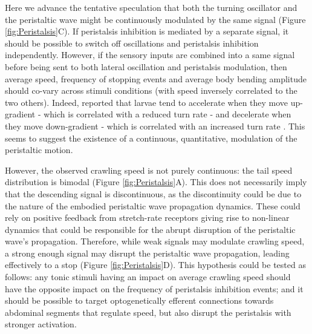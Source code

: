 \documentclass[11pt,a4paper]{article}
\begin{document}
Here we advance the tentative speculation that both the turning oscillator and the peristaltic wave might be continuously modulated by the same signal (Figure \ref{fig:Peristalsis}C).  If peristalsis inhibition is mediated by a separate signal, it should be possible to switch off oscillations and peristalsis inhibition independently. However, if the sensory inputs are combined into a same signal before being sent to both lateral oscillation and peristalsis modulation, then average speed, frequency of stopping events and average body bending amplitude should co-vary across stimuli conditions (with speed inversely correlated to the two others). Indeed, \cite{gomez2014multilevel} reported that larvae tend to accelerate when they move up-gradient - which is correlated with a reduced turn rate \citep{schleyer2015learning} - and decelerate when they move down-gradient - which is correlated with an increased turn rate \citep{schleyer2015learning}. This seems to suggest the existence of a continuous, quantitative, modulation of the peristaltic motion. 

However, the observed crawling speed is not purely continuous: the tail speed distribution is bimodal (Figure \ref{fig:Peristalsis}A).
 This does not necessarily imply that the descending signal is discontinuous, as the discontinuity could be due to the nature of the embodied peristaltic wave propagation dynamics. These could rely on positive feedback from stretch-rate receptors \citep{ross2015model} giving rise to non-linear dynamics that could be responsible for the abrupt disruption of the peristaltic wave's propagation.
 Therefore, while weak signals may modulate crawling speed, a strong enough signal may disrupt the peristaltic wave propagation, leading effectively to a stop (Figure \ref{fig:Peristalsis}D).
  This hypothesis could be tested as follows: any tonic stimuli having an impact on average crawling speed should have the opposite impact on the frequency of peristalsis inhibition events; and it should be possible to target optogenetically efferent connections towards abdominal segments that regulate speed, but also disrupt the peristalsis with stronger activation.
\end{document}
